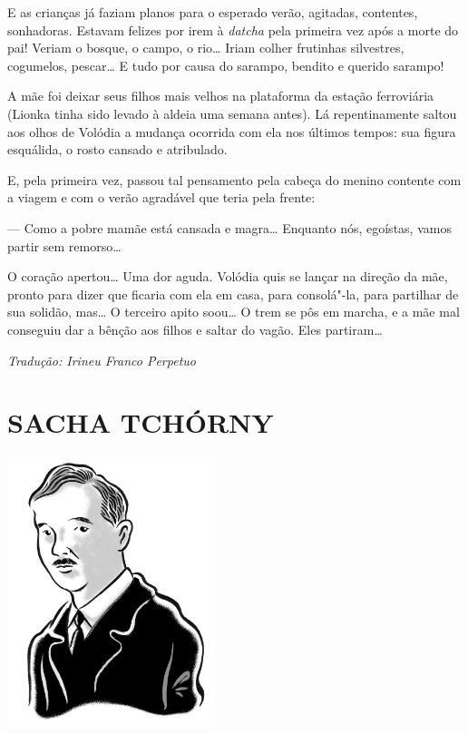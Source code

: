 E as crianças já faziam planos para o esperado verão, agitadas,
contentes, sonhadoras. Estavam felizes por irem à \emph{datcha} pela
primeira vez após a morte do pai! Veriam o bosque, o campo, o rio\ldots{}
Iriam colher frutinhas silvestres, cogumelos, pescar\ldots{} E tudo por causa
do sarampo, bendito e querido sarampo!

A mãe foi deixar seus filhos mais velhos na plataforma da estação
ferroviária (Lionka tinha sido levado à aldeia uma semana antes). Lá
repentinamente saltou aos olhos de Volódia a mudança ocorrida com ela
nos últimos tempos: sua figura esquálida, o rosto cansado e atribulado.

E, pela primeira vez, passou tal pensamento pela cabeça do menino
contente com a viagem e com o verão agradável que teria pela frente:

--- Como a pobre mamãe está cansada e magra\ldots{} Enquanto nós, egoístas,
vamos partir sem remorso\ldots{}

O coração apertou\ldots{} Uma dor aguda. Volódia quis se lançar na direção da
mãe, pronto para dizer que ficaria com ela em casa, para consolá"-la,
para partilhar de sua solidão, mas\ldots{} O terceiro apito soou\ldots{} O trem se
pôs em marcha, e a mãe mal conseguiu dar a bênção aos filhos e saltar do
vagão. Eles partiram\ldots{}

\medskip

{\footnotesize\hfill\emph{Tradução: Irineu Franco Perpetuo}}


\part[SACHA TCHÓRNY]{SACHA TCHÓRNY }

\pagebreak
\thispagestyle{empty}
\mbox{}
\vfill
\begin{center}
\includegraphics[width=6cm]{./imgs/autor11.jpg}
\end{center}

